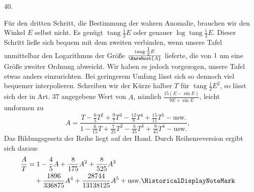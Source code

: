 \par{}
\begin{center}
\hypertarget{native-058-article040}{}40.
\end{center}
Für den dritten Schritt, die Bestimmung der wahren Anomalie, brauchen wir den Winkel $E$ selbst nicht. Es genügt $\operatorname{tang}\tfrac{1}{2}E$ oder genauer $\log\operatorname{tang}\tfrac{1}{2}E$. Dieser Schritt ließe sich bequem mit dem zweiten verbinden, wenn unsere Tafel unmittelbar den Logarithmus der Größe $\frac{\operatorname{tang}\tfrac{1}{2}E}{\BareRoot{A}}$ lieferte, die von $1$ um eine Größe zweiter Ordnung abweicht. Wir haben es jedoch vorgezogen, unsere Tafel etwas anders einzurichten. Bei geringerem Umfang lässt sich so dennoch viel bequemer interpolieren. Schreiben wir der Kürze halber $T$ für $\operatorname{tang}\tfrac{1}{2}E^2$, so lässt sich der in Art. 37 angegebene Wert von $A$, nämlich $\frac{15(E-\sin E)}{9E+\sin E}$, leicht umformen zu
\[
A=\frac{T-\tfrac{6}{5}T^2+\tfrac{9}{7}T^3-\tfrac{12}{9}T^4+\tfrac{15}{11}T^5-\text{usw.}}{1-\tfrac{6}{15}T+\tfrac{7}{25}T^2-\tfrac{8}{35}T^3+\tfrac{9}{45}T^4-\text{usw.}},
\]
Das Bildungsgesetz der Reihe liegt auf der Hand. Durch Reihenreversion ergibt sich daraus
\[
\begin{aligned}
\frac{A}{T}&=1-\frac{4}{5}A+\frac{8}{175}A^2+\frac{8}{525}A^3\\
&\quad+\frac{1896}{336875}A^4+\frac{28744}{13138125}A^5+\text{usw.}\mbox{\HistoricalDisplayNoteMark}
\end{aligned}
\]
\noindent\HistoricalDisplayNoteText{Handschriftliche Bemerkung:]
\[
\begin{aligned}
\log\operatorname{hyp}\frac{A}{T}&=-\frac{4}{5}A-\frac{48}{175}A^2-\frac{104}{875}A^3-\cdot\cdot\cdot\\
&=-\frac{4}{5}T+\frac{64}{175}T^2-\frac{8}{35}T^3+\cdot\cdot\cdot
\end{aligned}
\]
\[
\log\frac{A}{T}=-2Am=-2Tm'
\]
\begin{center}
\begin{tabular}{c|c|c@{\hspace{2em}}c|c}
$A$ & $\log m$ & $\log n$ & $T$ & $\log m'$ \\
$0.000$ & $9.23984$ & $9.63778$ & $0.000$ & $9.23984$ \\
$0.010$ & $9.24134$ & $9.63909$ & $0.010$ & $9.23787$ \\
$0.020$ & $9.24284$ & $9.64041$ & $0.020$ & $9.23591$ \\
$0.030$ & $9.24435$ & $9.64172$ & &
\end{tabular}
\end{center}
\[
\begin{gathered}
\operatorname{tang}\tfrac{1}{2}v=M\gamma\operatorname{tang}\tfrac{1}{2}w,\qquad r=\frac{q\sec\tfrac{1}{2}v^2}{N},\\
\log M=Am,\qquad \log N=An.
\end{gathered}
\]
}
